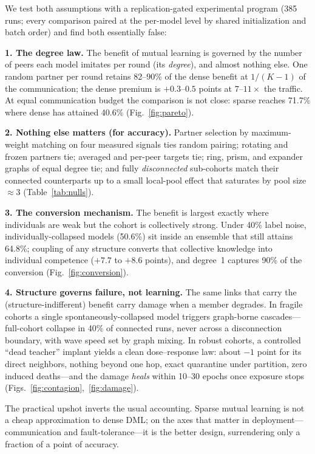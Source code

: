 \documentclass[10pt,twocolumn]{article}
\begin{document}
We test both assumptions with a replication-gated experimental program
(385 runs; every comparison paired at the per-model level by shared
initialization and batch order) and find both essentially false:

\textbf{1. The degree law.} The benefit of mutual learning is governed by the
number of peers each model imitates per round (its \emph{degree}), and almost
nothing else. One random partner per round retains 82--90\% of the dense
benefit at $1/(K{-}1)$ of the communication; the dense premium is
$+0.3$--$0.5$ points at $7$--$11\times$ the traffic. At equal communication
budget the comparison is not close: sparse reaches 71.7\% where dense has
attained 40.6\% (Fig.~\ref{fig:pareto}).

\textbf{2. Nothing else matters (for accuracy).} Partner selection by
maximum-weight matching on four measured signals ties random pairing;
rotating and frozen partners tie; averaged and per-peer targets tie; ring,
prism, and expander graphs of equal degree tie; and fully \emph{disconnected}
sub-cohorts match their connected counterparts up to a small local-pool
effect that saturates by pool size $\approx 3$
(Table~\ref{tab:nulls}).

\textbf{3. The conversion mechanism.} The benefit is largest exactly where
individuals are weak but the cohort is collectively strong. Under 40\% label
noise, individually-collapsed models (50.6\%) sit inside an ensemble that
still attains 64.8\%; coupling of any structure converts that collective
knowledge into individual competence ($+7.7$ to $+8.6$ points), and degree~1
captures 90\% of the conversion (Fig.~\ref{fig:conversion}).

\textbf{4. Structure governs failure, not learning.} The same links that
carry the (structure-indifferent) benefit carry damage when a member
degrades. In fragile cohorts a single spontaneously-collapsed model triggers
graph-borne cascades---full-cohort collapse in 40\% of connected runs, never
across a disconnection boundary, with wave speed set by graph mixing. In
robust cohorts, a controlled ``dead teacher'' implant yields a clean
dose--response law: about $-1$ point for its direct neighbors, nothing beyond
one hop, exact quarantine under partition, zero induced deaths---and the
damage \emph{heals} within 10--30 epochs once exposure stops
(Figs.~\ref{fig:contagion},~\ref{fig:damage}).

The practical upshot inverts the usual accounting. Sparse mutual learning is
not a cheap approximation to dense DML; on the axes that matter in
deployment---communication and fault-tolerance---it is the better design,
surrendering only a fraction of a point of accuracy.
\end{document}
